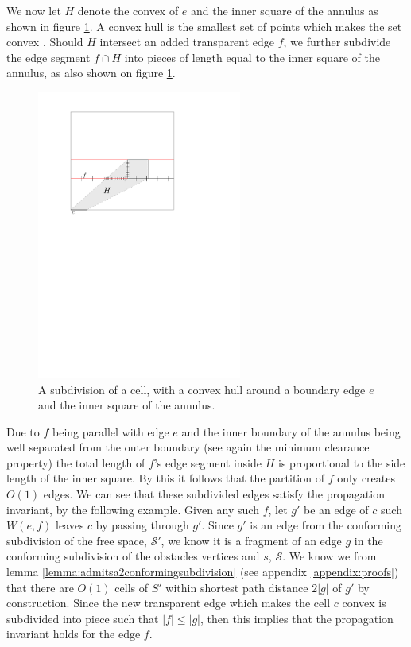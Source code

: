 We now let $H$ denote the convex of $e$ and the inner square of the annulus as shown in figure 
\ref{fig:subdividedconvexhull}. A convex hull is the smallest set of points which makes the set convex \cite{CompGeo}.  
Should $H$ intersect an added transparent edge $f$, we further subdivide the 
edge segment $f \cap H$ into pieces of length equal to the inner square of the annulus, as also shown on figure 
\ref{fig:subdividedconvexhull}. 

\begin{figure}[H]
	\centering
	\includegraphics[width=0.6\textwidth]{figures/subdividedconvexhull.pdf}
	\caption{A subdivision of a cell, with a convex hull around a boundary edge $e$ and the inner square of 
    		 the annulus.}
	\label{fig:subdividedconvexhull}
\end{figure}

Due to $f$ being parallel with edge $e$ and the inner boundary of the annulus being well separated from the
outer boundary (see again the minimum clearance property) the total length of $f$'s edge segment inside $H$ is 
proportional to the side length of the inner square. By this it follows that the partition of $f$ only creates 
$O(1)$ edges. We can see that these subdivided edges satisfy the propagation invariant, by the following example. 
Given any such $f$, let $g'$ be an edge of $c$ such $W(e,f)$ leaves $c$ by passing through $g'$. Since $g'$ is an 
edge from the conforming subdivision of the free space, $\mathcal{S}'$, we know it is a fragment of an edge $g$ in 
the conforming subdivision of the obstacles vertices and $s$, $\mathcal{S}$. We know we from lemma 
\ref{lemma:admitsa2conformingsubdivision} (see appendix \ref{appendix:proofs}) that there are $O(1)$ cells of $S'$ 
within shortest path distance $2|g|$ 
of $g'$ by construction. Since the new transparent edge which makes the cell $c$ convex is subdivided into piece 
such that $|f| \leq |g|$, then this implies that the propagation invariant holds for the edge $f$.

